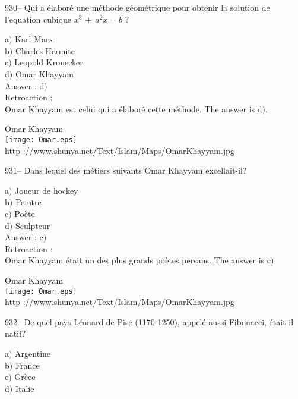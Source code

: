 ﻿\documentclass[letterpaper, 12pt]{article}
\begin{document}
930-- Qui a \'elabor\'e une m\'ethode g\'eom\'etrique pour obtenir
la solution de l'equation cubique $x^3\,+\,a^2x=b$ ?

a$)$ Karl Marx \\
b$)$ Charles Hermite \\
c$)$ Leopold Kronecker \\
d$)$ Omar Khayyam \\

Answer : d$)$\\

Retroaction :\\
Omar Khayyam est celui qui a \'elabor\'e cette m\'ethode. The answer is
d$)$.\\

        \begin{center}
        Omar Khayyam\\
    \texttt{[image: Omar.eps]}\\
        {\footnotesize http
://www.shunya.net/Text/Islam/Maps/OmarKhayyam.jpg}
    \end{center}

931-- Dans lequel des m\'etiers suivants Omar Khayyam excellait-il?

a$)$ Joueur de hockey \\
b$)$ Peintre \\
c$)$ Po\`ete \\
d$)$ Sculpteur \\

Answer : c$)$\\

Retroaction : \\
Omar Khayyam \'etait un des plus grands po\`etes persans. The answer is
c$)$.\\

        \begin{center}
        Omar Khayyam\\
    \texttt{[image: Omar.eps]}\\
        {\footnotesize http
://www.shunya.net/Text/Islam/Maps/OmarKhayyam.jpg}
    \end{center}

932-- De quel pays L\'eonard de Pise (1170-1250), appel\'e aussi
Fibonacci, \'etait-il natif?

a$)$ Argentine \\
b$)$ France  \\
c$)$ Gr\`ece  \\
d$)$ Italie \\
\end{document}
